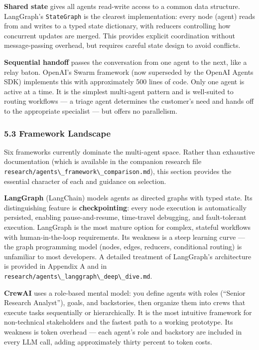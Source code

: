 \documentclass[11pt, a4paper]{article}
\newcommand{\passthrough}[1]{#1}
\begin{document}
\textbf{Shared state} gives all agents read-write access to a common
data structure. LangGraph's \passthrough{\lstinline!StateGraph!} is the
clearest implementation: every node (agent) reads from and writes to a
typed state dictionary, with reducers controlling how concurrent updates
are merged. This provides explicit coordination without message-passing
overhead, but requires careful state design to avoid conflicts.

\textbf{Sequential handoff} passes the conversation from one agent to
the next, like a relay baton. OpenAI's Swarm framework (now superseded
by the OpenAI Agents SDK) implements this with approximately 500 lines
of code. Only one agent is active at a time. It is the simplest
multi-agent pattern and is well-suited to routing workflows --- a triage
agent determines the customer's need and hands off to the appropriate
specialist --- but offers no parallelism.

\hypertarget{framework-landscape}{%
\subsubsection{5.3 Framework Landscape}\label{framework-landscape}}

Six frameworks currently dominate the multi-agent space. Rather than
exhaustive documentation (which is available in the companion research
file
\passthrough{\lstinline!research/agents\_framework\_comparison.md!}),
this section provides the essential character of each and guidance on
selection.

\textbf{LangGraph} (LangChain) models agents as directed graphs with
typed state. Its distinguishing feature is \textbf{checkpointing}: every
node execution is automatically persisted, enabling pause-and-resume,
time-travel debugging, and fault-tolerant execution. LangGraph is the
most mature option for complex, stateful workflows with
human-in-the-loop requirements. Its weakness is a steep learning curve
--- the graph programming model (nodes, edges, reducers, conditional
routing) is unfamiliar to most developers. A detailed treatment of
LangGraph's architecture is provided in Appendix A and in
\passthrough{\lstinline!research/agents\_langgraph\_deep\_dive.md!}.

\textbf{CrewAI} uses a role-based mental model: you define agents with
roles (``Senior Research Analyst''), goals, and backstories, then
organize them into crews that execute tasks sequentially or
hierarchically. It is the most intuitive framework for non-technical
stakeholders and the fastest path to a working prototype. Its weakness
is token overhead --- each agent's role and backstory are included in
every LLM call, adding approximately thirty percent to token costs.
\end{document}

